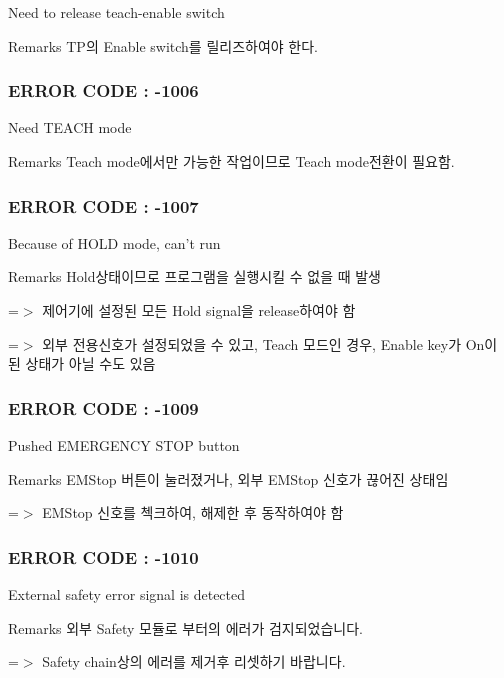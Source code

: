 Need to release teach-\/enable switch \begin{DoxyRemark}{Remarks}
T\-P의 Enable switch를 릴리즈하여야 한다.
\end{DoxyRemark}


 \subsubsection*{E\-R\-R\-O\-R C\-O\-D\-E \-: -\/1006 }

Need T\-E\-A\-C\-H mode \begin{DoxyRemark}{Remarks}
Teach mode에서만 가능한 작업이므로 Teach mode전환이 필요함.
\end{DoxyRemark}


 \subsubsection*{E\-R\-R\-O\-R C\-O\-D\-E \-: -\/1007 }

Because of H\-O\-L\-D mode, can't run \begin{DoxyRemark}{Remarks}
Hold상태이므로 프로그램을 실행시킬 수 없을 때 발생 \par
 =$>$ 제어기에 설정된 모든 Hold signal을 release하여야 함 \par
 =$>$ 외부 전용신호가 설정되었을 수 있고, Teach 모드인 경우, Enable key가 On이 된 상태가 아닐 수도 있음
\end{DoxyRemark}


 \subsubsection*{E\-R\-R\-O\-R C\-O\-D\-E \-: -\/1009 }

Pushed E\-M\-E\-R\-G\-E\-N\-C\-Y S\-T\-O\-P button \begin{DoxyRemark}{Remarks}
E\-M\-Stop 버튼이 눌러졌거나, 외부 E\-M\-Stop 신호가 끊어진 상태임 \par
 =$>$ E\-M\-Stop 신호를 첵크하여, 해제한 후 동작하여야 함
\end{DoxyRemark}


 \subsubsection*{E\-R\-R\-O\-R C\-O\-D\-E \-: -\/1010 }

External safety error signal is detected \begin{DoxyRemark}{Remarks}
외부 Safety 모듈로 부터의 에러가 검지되었습니다. \par
 =$>$ Safety chain상의 에러를 제거후 리셋하기 바랍니다.
\end{DoxyRemark}


